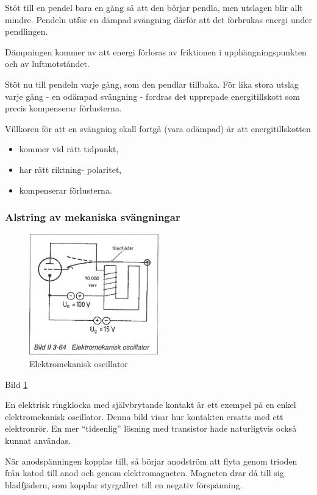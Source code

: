 Stöt till en pendel bara en gång så att den börjar pendla, men
utslagen blir allt mindre. Pendeln utför en dämpad svängning därför
att det förbrukas energi under pendlingen.

Dämpningen kommer av att energi förloras av friktionen i
upphängningspunkten och av luftmotståndet.

Stöt nu till pendeln varje gång, som den pendlar tillbaka. För lika
stora utslag varje gång - en odämpad svängning - fordras det upprepade
energitillskott som precis kompenserar förlusterna.

Villkoren för att en svängning skall fortgå (vara odämpad) är att
energitillskotten
\begin{itemize}
\item kommer vid rätt tidpunkt,
\item har rätt riktning- polaritet,
\item kompenserar förlusterna.
\end{itemize}

\subsubsection{Alstring av mekaniska svängningar}

\begin{figure}
\includegraphics[width=0.5\textwidth]{images/bild_2_3-64}
\caption{Elektromekanisk oscillator}
\label{fig:BildII3-64}
\end{figure}

Bild \ref{fig:BildII3-64}

En elektrisk ringklocka med självbrytande kontakt är ett exempel på en
enkel elektromekanisk oscillator. Denna bild visar hur kontakten
ersatts med ett elektronrör. En mer ``tidsenlig'' lösning med transistor
hade naturligtvis också kunnat användas.

När anodspänningen kopplas till, så börjar anodström att flyta genom
trioden från katod till anod och genom elektromagneten.  Magneten drar
då till sig bladfjädern, som kopplar styrgallret till en negativ
förspänning.

